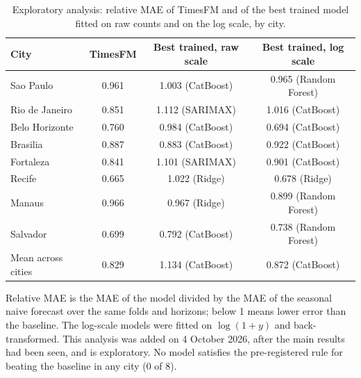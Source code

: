 \begin{table}[htbp]
\centering
\small
\setlength{\tabcolsep}{5pt}
\caption{Exploratory analysis: relative MAE of TimesFM and of the best trained model
fitted on raw counts and on the log scale, by city.}
\label{tab:exploratory}
\begin{tabular}{lccc}
\toprule
City & TimesFM & Best trained, raw scale & Best trained, log scale \\
\midrule
Sao Paulo & 0.961 & 1.003 (CatBoost) & 0.965 (Random Forest) \\
Rio de Janeiro & 0.851 & 1.112 (SARIMAX) & 1.016 (CatBoost) \\
Belo Horizonte & 0.760 & 0.984 (CatBoost) & 0.694 (CatBoost) \\
Brasilia & 0.887 & 0.883 (CatBoost) & 0.922 (CatBoost) \\
Fortaleza & 0.841 & 1.101 (SARIMAX) & 0.901 (CatBoost) \\
Recife & 0.665 & 1.022 (Ridge) & 0.678 (Ridge) \\
Manaus & 0.966 & 0.967 (Ridge) & 0.899 (Random Forest) \\
Salvador & 0.699 & 0.792 (CatBoost) & 0.738 (Random Forest) \\
\midrule
Mean across cities & 0.829 & 1.134 (CatBoost) & 0.872 (CatBoost) \\
\bottomrule
\end{tabular}

\vspace{0.5em}
\begin{minipage}{\textwidth}
\footnotesize
Relative MAE is the MAE of the model divided by the MAE of the seasonal naive forecast
over the same folds and horizons; below 1 means lower error than the baseline. The
log-scale models were fitted on $\log(1+y)$ and back-transformed. This analysis was added
on 4 October 2026, after the main results had been seen, and is exploratory. No model
satisfies the pre-registered rule for beating the baseline in any city
(0 of 8).
\end{minipage}
\end{table}
